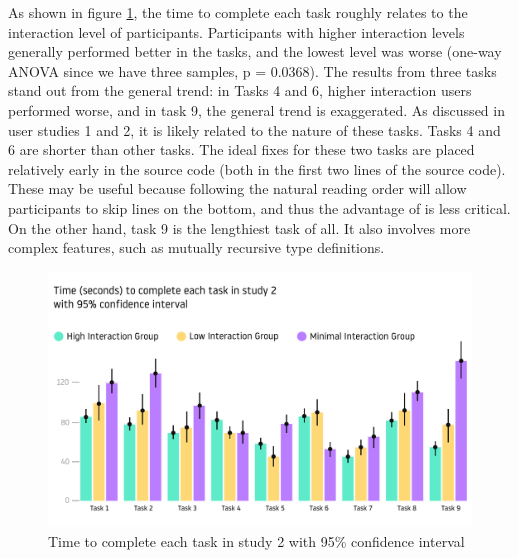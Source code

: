 As shown in  figure \ref{fig:r4-analysis}, the time to complete each task roughly relates to the interaction level of participants. Participants with higher interaction levels generally performed better in the tasks, and the lowest level was worse (one-way ANOVA since we have three samples, p = 0.0368). The results from three tasks stand out from the general trend: in Tasks 4 and 6, higher interaction users performed worse, and in task 9, the general trend is exaggerated. As discussed in user studies 1 and 2, it is likely related to the nature of these tasks. Tasks 4 and 6 are shorter than other tasks. The ideal fixes for these two tasks are placed relatively early in the source code (both in the first two lines of the source code). These may be useful because following the natural reading order will allow participants to skip lines on the bottom, and thus the advantage of \chameleon{} is less critical. On the other hand, task 9 is the lengthiest task of all. It also involves more complex features, such as mutually recursive type definitions.

\begin{figure}[h]
    \centering
    \includegraphics[width=\linewidth]{images/user-study-2.pdf}
    \caption{Time to complete each task in study 2 with 95\% confidence interval}
    \label{fig:r4-analysis}
\end{figure}




